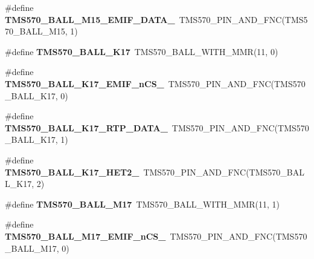 \begin{DoxyCompactItemize}
\mbox{\label{tms570ls3137zwt-pins_8h_a1d53c297d96ecb81679451995de339f4}} 
\#define {\bfseries T\+M\+S570\+\_\+\+B\+A\+L\+L\+\_\+\+M15\+\_\+\+E\+M\+I\+F\+\_\+\+D\+A\+T\+A\+\_}~T\+M\+S570\+\_\+\+P\+I\+N\+\_\+\+A\+N\+D\+\_\+\+F\+NC(T\+M\+S570\+\_\+\+B\+A\+L\+L\+\_\+\+M15, 1)
\item 
\mbox{\label{tms570ls3137zwt-pins_8h_a8a5168c62f8db42146e1974a172dcb22}} 
\#define {\bfseries T\+M\+S570\+\_\+\+B\+A\+L\+L\+\_\+\+K17}~T\+M\+S570\+\_\+\+B\+A\+L\+L\+\_\+\+W\+I\+T\+H\+\_\+\+M\+MR(11, 0)
\item 
\mbox{\label{tms570ls3137zwt-pins_8h_a5859f43c171671b921caeda68e21cd8a}} 
\#define {\bfseries T\+M\+S570\+\_\+\+B\+A\+L\+L\+\_\+\+K17\+\_\+\+E\+M\+I\+F\+\_\+n\+C\+S\+\_}~T\+M\+S570\+\_\+\+P\+I\+N\+\_\+\+A\+N\+D\+\_\+\+F\+NC(T\+M\+S570\+\_\+\+B\+A\+L\+L\+\_\+\+K17, 0)
\item 
\mbox{\label{tms570ls3137zwt-pins_8h_aea3ccd613930caaba2d53d24d076780f}} 
\#define {\bfseries T\+M\+S570\+\_\+\+B\+A\+L\+L\+\_\+\+K17\+\_\+\+R\+T\+P\+\_\+\+D\+A\+T\+A\+\_}~T\+M\+S570\+\_\+\+P\+I\+N\+\_\+\+A\+N\+D\+\_\+\+F\+NC(T\+M\+S570\+\_\+\+B\+A\+L\+L\+\_\+\+K17, 1)
\item 
\mbox{\label{tms570ls3137zwt-pins_8h_a6e2babda6c4b8db20c39cb905786651f}} 
\#define {\bfseries T\+M\+S570\+\_\+\+B\+A\+L\+L\+\_\+\+K17\+\_\+\+H\+E\+T2\+\_}~T\+M\+S570\+\_\+\+P\+I\+N\+\_\+\+A\+N\+D\+\_\+\+F\+NC(T\+M\+S570\+\_\+\+B\+A\+L\+L\+\_\+\+K17, 2)
\item 
\mbox{\label{tms570ls3137zwt-pins_8h_af53b5bb01e375989a253f6a6d44f0b61}} 
\#define {\bfseries T\+M\+S570\+\_\+\+B\+A\+L\+L\+\_\+\+M17}~T\+M\+S570\+\_\+\+B\+A\+L\+L\+\_\+\+W\+I\+T\+H\+\_\+\+M\+MR(11, 1)
\item 
\mbox{\label{tms570ls3137zwt-pins_8h_ad6d6e9d47deb5c2cdd2eed250be280dc}} 
\#define {\bfseries T\+M\+S570\+\_\+\+B\+A\+L\+L\+\_\+\+M17\+\_\+\+E\+M\+I\+F\+\_\+n\+C\+S\+\_}~T\+M\+S570\+\_\+\+P\+I\+N\+\_\+\+A\+N\+D\+\_\+\+F\+NC(T\+M\+S570\+\_\+\+B\+A\+L\+L\+\_\+\+M17, 0)
\item 
\mbox{\label{tms570ls3137zwt-pins_8h_a3f915c0aa745e8c9eeb78ce26ca5d6b3}} 

\end{DoxyCompactItemize}
